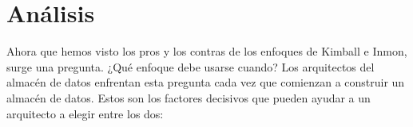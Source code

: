 \documentclass[twoside,twocolumn]{article}
\begin{document}
\begin{enumerate}
\begin{enumerate}
\end{enumerate}
    
\end{enumerate}










\section{Análisis}
Ahora que hemos visto los pros y los contras de los enfoques de Kimball e Inmon, surge una pregunta. ¿Qué enfoque debe usarse cuando? Los arquitectos del almacén de datos enfrentan esta pregunta cada vez que comienzan a construir un almacén de datos. Estos son los factores decisivos que pueden ayudar a un arquitecto a elegir entre los dos:\\
\end{document}
